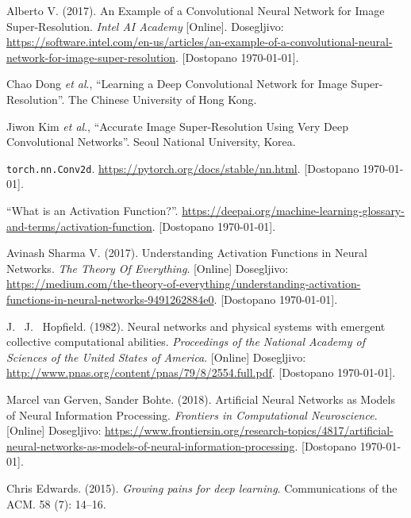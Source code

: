 \documentclass[a4paper,11pt]{article}
\begin{document}
\begin{thebibliography}{99}


 Alberto V\@. (2017). An Example of a Convolutional Neural Network for Image Super-Resolution.
	\emph{Intel AI Academy} [Online]. Dosegljivo:
	\url{https://software.intel.com/en-us/articles/an-example-of-a-convolutional-neural-network-for-image-super-resolution}.
	[Dostopano \today].

 Chao Dong \emph{et al}., ``Learning a Deep Convolutional Network for Image Super-Resolution''. The Chinese University of Hong Kong.

 Jiwon Kim \emph{et al}., ``Accurate Image Super-Resolution Using Very Deep Convolutional Networks''.
	Seoul National University, Korea.

 \texttt{torch.nn.Conv2d}. \url{https://pytorch.org/docs/stable/nn.html}. [Dostopano \today].

 ``What is an Activation Function?''. \url{https://deepai.org/machine-learning-glossary-and-terms/activation-function}.
	[Dostopano \today].

 Avinash Sharma V\@. (2017). Understanding Activation Functions in Neural Networks. \emph{The Theory Of Everything}.
	[Online] Dosegljivo: \url{https://medium.com/the-theory-of-everything/understanding-activation-functions-in-neural-networks-9491262884e0}.
	[Dostopano \today].

 J.~ J.~ Hopfield. (1982). Neural networks and physical systems with emergent collective computational abilities.
	\emph{Proceedings of the National Academy of Sciences of the United States of America}. [Online] Dosegljivo:
	\url{http://www.pnas.org/content/pnas/79/8/2554.full.pdf}. [Dostopano \today].

 Marcel van Gerven, Sander Bohte. (2018). Artificial Neural Networks as Models of Neural Information Processing.
	\emph{Frontiers in Computational Neuroscience}. [Online] Dosegljivo:
	\url{https://www.frontiersin.org/research-topics/4817/artificial-neural-networks-as-models-of-neural-information-processing}.
	[Dostopano \today].

 Chris Edwards. (2015). \emph{Growing pains for deep learning}. Communications of the ACM. 58 (7): 14–16.


\end{thebibliography}
\end{document}

